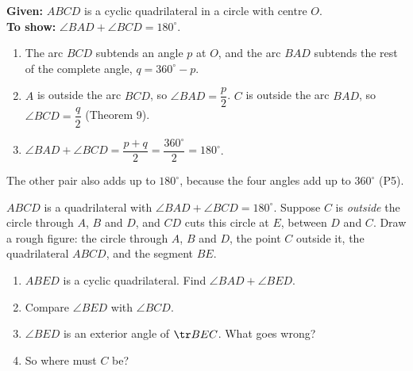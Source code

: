 
\why
\textbf{Given:} $ABCD$ is a cyclic quadrilateral in a circle with centre $O$.\\
\textbf{To show:} $\angle BAD+\angle BCD=180^\circ$.
\begin{enumerate}[leftmargin=1.8em,itemsep=1pt]
  \item The arc $BCD$ subtends an angle $p$ at $O$, and the arc $BAD$ subtends the rest of the complete angle, $q=360^\circ-p$.
  \item $A$ is outside the arc $BCD$, so $\angle BAD=\dfrac{p}{2}$. $C$ is outside the arc $BAD$, so $\angle BCD=\dfrac{q}{2}$ (Theorem 9).
  \item $\angle BAD+\angle BCD=\dfrac{p+q}{2}=\dfrac{360^\circ}{2}=180^\circ$.
\end{enumerate}
The other pair also adds up to $180^\circ$, because the four angles add up to $360^\circ$ (P5).

\begin{solvefirst}
  \item $ABCD$ is a quadrilateral with $\angle BAD+\angle BCD=180^\circ$. Suppose $C$ is \emph{outside} the circle through $A$, $B$ and $D$, and $CD$ cuts this circle at $E$, between $D$ and $C$. Draw a rough figure: the circle through $A$, $B$ and $D$, the point $C$ outside it, the quadrilateral $ABCD$, and the segment $BE$.
  \begin{enumerate}[label=(\alph*),itemsep=1pt]
    \item $ABED$ is a cyclic quadrilateral. Find $\angle BAD+\angle BED$.
    \item Compare $\angle BED$ with $\angle BCD$.
    \item $\angle BED$ is an exterior angle of $\tr BEC$. What goes wrong?
    \item So where must $C$ be?
  \end{enumerate}
\end{solvefirst}

